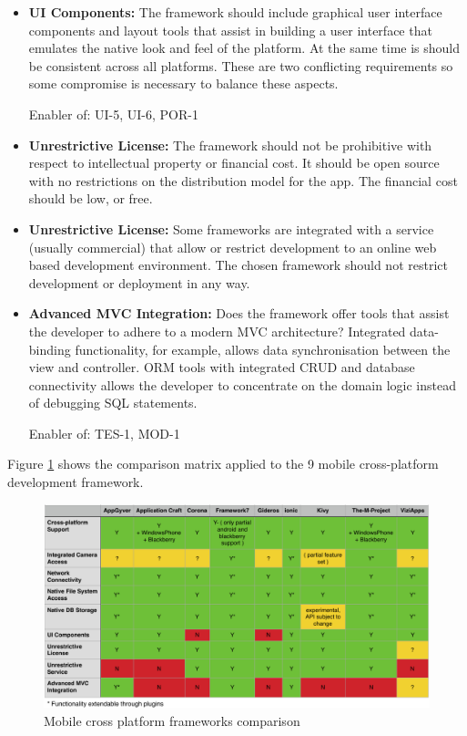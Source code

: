 \begin{itemize}[label={}]
Enabler of: INT-1, INT-2, INT-3, Metadata.Location.*, Metadata.Text.*, Archive.Save, Archive.Browse, Archive.Select.*

\item \textbf{UI Components:} The framework should include graphical user interface components and layout tools that assist in building a user interface that emulates the native look and feel of the platform. At the same time is should be consistent across all platforms. These are two conflicting requirements so some compromise is necessary to balance these aspects.

Enabler of: UI-5, UI-6, POR-1

\item \textbf{Unrestrictive License:} The framework should not be prohibitive with respect to intellectual property or financial cost. It should be open source with no restrictions on the distribution model for the app. The financial cost should be low, or free.

\item \textbf{Unrestrictive License:} Some frameworks are integrated with a service (usually commercial) that allow or restrict development to an online web based development environment. The chosen framework should not restrict development or deployment in any way.


\item \textbf{Advanced MVC Integration:} Does the framework offer tools that assist the developer to adhere to a modern MVC architecture? Integrated data-binding functionality, for example, allows data synchronisation between the view and controller. ORM tools with integrated CRUD and database connectivity allows the developer to concentrate on the domain logic instead of debugging SQL statements.

Enabler of: TES-1, MOD-1

\end{itemize}

Figure \ref{fig:comp_fw} shows the comparison matrix applied to the 9 mobile cross-platform development framework.

\begin{figure}[H]
    \centering
    \includegraphics[width=\textwidth,keepaspectratio]{assets/architecture/framework_comparison.pdf}
    \caption{Mobile cross platform frameworks comparison}
    \label{fig:comp_fw}
\end{figure}

